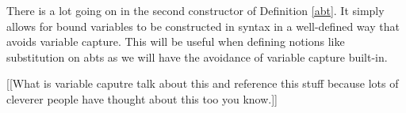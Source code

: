 \begin{remark}
    There is a lot going on in the second constructor of Definition \ref{abt}. It simply allows for bound variables to be constructed in syntax in a well-defined way that avoids variable capture. This will be useful when defining notions like substitution on abts as we will have the avoidance of variable capture built-in.
\end{remark}

[[What is variable caputre talk about this and reference this stuff because lots of cleverer people have thought about this too you know.]]


